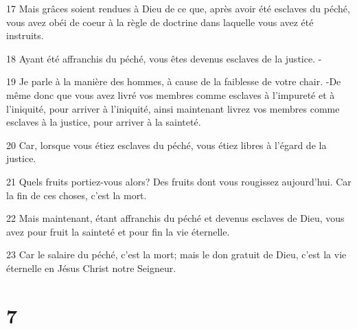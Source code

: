 \par 17 Mais grâces soient rendues à Dieu de ce que, après avoir été esclaves du péché, vous avez obéi de coeur à la règle de doctrine dans laquelle vous avez été instruits.
\par 18 Ayant été affranchis du péché, vous êtes devenus esclaves de la justice. -
\par 19 Je parle à la manière des hommes, à cause de la faiblesse de votre chair. -De même donc que vous avez livré vos membres comme esclaves à l'impureté et à l'iniquité, pour arriver à l'iniquité, ainsi maintenant livrez vos membres comme esclaves à la justice, pour arriver à la sainteté.
\par 20 Car, lorsque vous étiez esclaves du péché, vous étiez libres à l'égard de la justice.
\par 21 Quels fruits portiez-vous alors? Des fruits dont vous rougissez aujourd'hui. Car la fin de ces choses, c'est la mort.
\par 22 Mais maintenant, étant affranchis du péché et devenus esclaves de Dieu, vous avez pour fruit la sainteté et pour fin la vie éternelle.
\par 23 Car le salaire du péché, c'est la mort; mais le don gratuit de Dieu, c'est la vie éternelle en Jésus Christ notre Seigneur.

\chapter{7}

